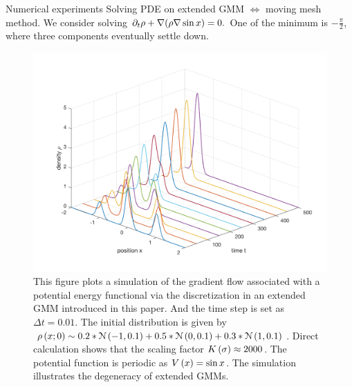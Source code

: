 \documentclass{beamer}
\begin{document}
\begin{frame}{Numerical experiments}
Solving PDE on extended GMM $\Longleftrightarrow$ moving mesh method. We consider solving $\partial_t \rho + \nabla (\rho \nabla \sin x) = 0.$ One of the minimum is $-\frac{\pi}{2}$, where three components eventually settle down.
\begin{figure}[h]
  \centering
  \centerline{\includegraphics[width=0.7\linewidth]{degeneracy.jpg}}
  \caption{
  \scriptsize{
  This figure plots a simulation of the gradient flow associated with a potential energy functional via the discretization in an extended GMM introduced in this paper. And the time step is set as $\Delta t = 0.01$. The initial distribution is given by $\rho\left( x; 0 \right) \sim 0.2 * \mathcal{N}\left( -1, 0.1 \right) + 0.5 * \mathcal{N}\left( 0, 0.1 \right) + 0.3 * \mathcal{N}\left( 1, 0.1 \right)$. Direct calculation shows that the scaling factor $K\left( \sigma \right) \approx 2000$. The potential function is periodic as $V\left( x \right) = \sin x$. The simulation illustrates the degeneracy of extended GMMs.}}
\end{figure}
\end{frame}
\end{document}
